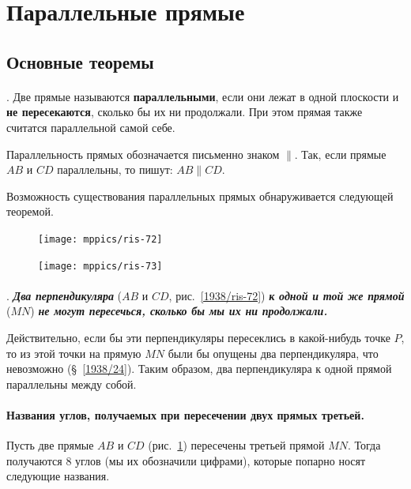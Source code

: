\documentclass[oneside]{book}
\begin{document}
\section{Параллельные прямые}

\subsection*{Основные теоремы}

\paragraph{}\label{1938/70}
.
Две прямые называются \textbf{параллельными}, если они лежат в одной плоскости и \textbf{не пересекаются}, сколько бы их ни продолжали.
При этом прямая также считатся параллельной самой себе.

Параллельность прямых обозначается письменно знаком $\parallel$.
Так, если прямые $AB$ и $CD$ параллельны, то пишут:
$AB \parallel CD$. 

Возможность существования параллельных прямых обнаруживается следующей теоремой.

\begin{figure}
\centering
\texttt{[image: mppics/ris-72]}
\caption{}\label{1938/ris-72}
\bigskip
\texttt{[image: mppics/ris-73]}
\caption{}\label{1938/ris-73}
\end{figure}

\paragraph{}\label{1938/71}
\mbox{.}
\textbf{\emph{Два перпендикуляра}} ($AB$ и $CD$, рис.~\ref{1938/ris-72}) \textbf{\emph{к одной и той же прямой}} ($MN$) \textbf{\emph{не могут пересечься, сколько бы мы их ни продолжали.}}

Действительно, если бы эти перпендикуляры пересеклись в какой-нибудь точке $P$, то из этой точки на прямую $MN$ были бы опущены два перпендикуляра, что невозможно (§~\ref{1938/24}).
Таким образом, два перпендикуляра к одной прямой параллельны между собой.

\paragraph{Названия углов, получаемых при пересечении двух прямых третьей.}\label{1938/72}
Пусть две прямые $AB$ и $CD$ (рис.~\ref{1938/ris-73}) пересечены третьей прямой $MN$.
Тогда получаются 8 углов (мы их обозначили цифрами), которые попарно носят следующие названия.
\end{document}
